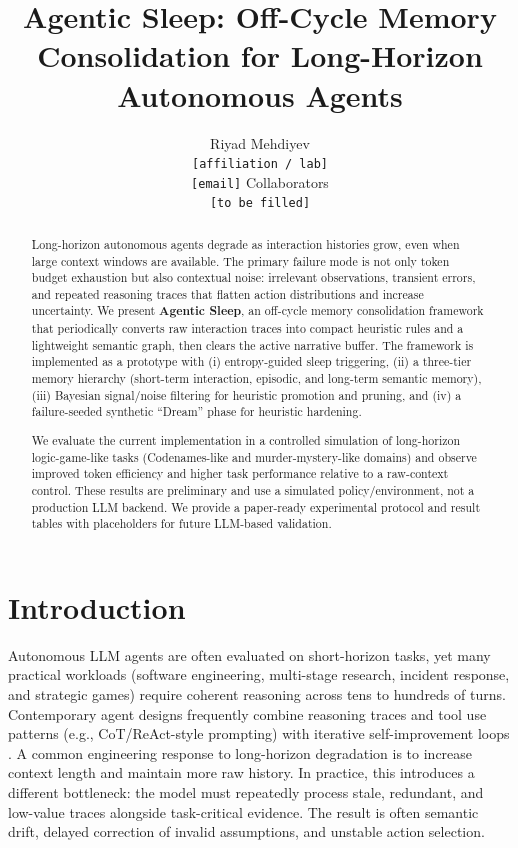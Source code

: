 \documentclass{article}
\title{Agentic Sleep: Off-Cycle Memory Consolidation for Long-Horizon Autonomous Agents}
\author{
  Riyad Mehdiyev \\
  \texttt{[affiliation / lab]} \\
  \texttt{[email]}
  \And
  Collaborators \\
  \texttt{[to be filled]}
}
\date{}
\begin{document}
\maketitle

\begin{abstract}
Long-horizon autonomous agents degrade as interaction histories grow, even when large context windows are available. The primary failure mode is not only token budget exhaustion but also contextual noise: irrelevant observations, transient errors, and repeated reasoning traces that flatten action distributions and increase uncertainty. We present \textbf{Agentic Sleep}, an off-cycle memory consolidation framework that periodically converts raw interaction traces into compact heuristic rules and a lightweight semantic graph, then clears the active narrative buffer. The framework is implemented as a prototype with (i) entropy-guided sleep triggering, (ii) a three-tier memory hierarchy (short-term interaction, episodic, and long-term semantic memory), (iii) Bayesian signal/noise filtering for heuristic promotion and pruning, and (iv) a failure-seeded synthetic ``Dream'' phase for heuristic hardening.

We evaluate the current implementation in a controlled simulation of long-horizon logic-game-like tasks (Codenames-like and murder-mystery-like domains) and observe improved token efficiency and higher task performance relative to a raw-context control. These results are preliminary and use a simulated policy/environment, not a production LLM backend. We provide a paper-ready experimental protocol and result tables with placeholders for future LLM-based validation.
\end{abstract}

\section{Introduction}

Autonomous LLM agents are often evaluated on short-horizon tasks, yet many practical workloads (software engineering, multi-stage research, incident response, and strategic games) require coherent reasoning across tens to hundreds of turns. Contemporary agent designs frequently combine reasoning traces and tool use patterns (e.g., CoT/ReAct-style prompting) with iterative self-improvement loops \citep{wei2022cot, yao2023react, madaan2023selfrefine}. A common engineering response to long-horizon degradation is to increase context length and maintain more raw history. In practice, this introduces a different bottleneck: the model must repeatedly process stale, redundant, and low-value traces alongside task-critical evidence. The result is often semantic drift, delayed correction of invalid assumptions, and unstable action selection.
\end{document}
